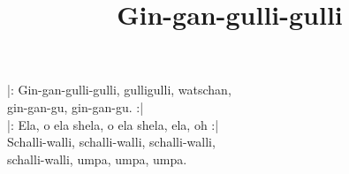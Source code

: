 \title{Gin-gan-gulli-gulli} 

|: Gin-gan-gulli-gulli, gulligulli, watschan, \\ 
gin-gan-gu, gin-gan-gu. :| \\ 
|: Ela, o ela shela, o ela shela, ela, oh :| \\ 
Schalli-walli, schalli-walli, schalli-walli, \\ 
schalli-walli, umpa, umpa, umpa.

